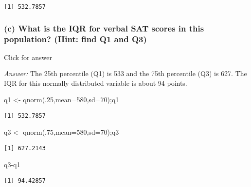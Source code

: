 \documentclass[
]{book}
\newenvironment{Shaded}{\begin{snugshade}}{\end{snugshade}}
\newcommand{\AttributeTok}[1]{\textcolor[rgb]{0.77,0.63,0.00}{#1}}
\newcommand{\DecValTok}[1]{\textcolor[rgb]{0.00,0.00,0.81}{#1}}
\newcommand{\FunctionTok}[1]{\textcolor[rgb]{0.00,0.00,0.00}{#1}}
\newcommand{\NormalTok}[1]{#1}
\newcommand{\OtherTok}[1]{\textcolor[rgb]{0.56,0.35,0.01}{#1}}
\newcommand{\SpecialCharTok}[1]{\textcolor[rgb]{0.00,0.00,0.00}{#1}}
\begin{document}
\begin{verbatim}
[1] 532.7857
\end{verbatim}

\hypertarget{c-what-is-the-iqr-for-verbal-sat-scores-in-this-population-hint-find-q1-and-q3}{%
\subsubsection{(c) What is the IQR for verbal SAT scores in this population? (Hint: find Q1 and Q3)}\label{c-what-is-the-iqr-for-verbal-sat-scores-in-this-population-hint-find-q1-and-q3}}

Click for answer

\emph{Answer:} The 25th percentile (Q1) is 533 and the 75th percentile (Q3) is 627. The IQR for this normally distributed variable is about 94 points.

\begin{Shaded}
\begin{Highlighting}[]
\NormalTok{q1 }\OtherTok{\textless{}{-}} \FunctionTok{qnorm}\NormalTok{(.}\DecValTok{25}\NormalTok{,}\AttributeTok{mean=}\DecValTok{580}\NormalTok{,}\AttributeTok{sd=}\DecValTok{70}\NormalTok{);q1}
\end{Highlighting}
\end{Shaded}

\begin{verbatim}
[1] 532.7857
\end{verbatim}

\begin{Shaded}
\begin{Highlighting}[]
\NormalTok{q3 }\OtherTok{\textless{}{-}} \FunctionTok{qnorm}\NormalTok{(.}\DecValTok{75}\NormalTok{,}\AttributeTok{mean=}\DecValTok{580}\NormalTok{,}\AttributeTok{sd=}\DecValTok{70}\NormalTok{);q3}
\end{Highlighting}
\end{Shaded}

\begin{verbatim}
[1] 627.2143
\end{verbatim}

\begin{Shaded}
\begin{Highlighting}[]
\NormalTok{q3}\SpecialCharTok{{-}}\NormalTok{q1}
\end{Highlighting}
\end{Shaded}

\begin{verbatim}
[1] 94.42857
\end{verbatim}
\end{document}
